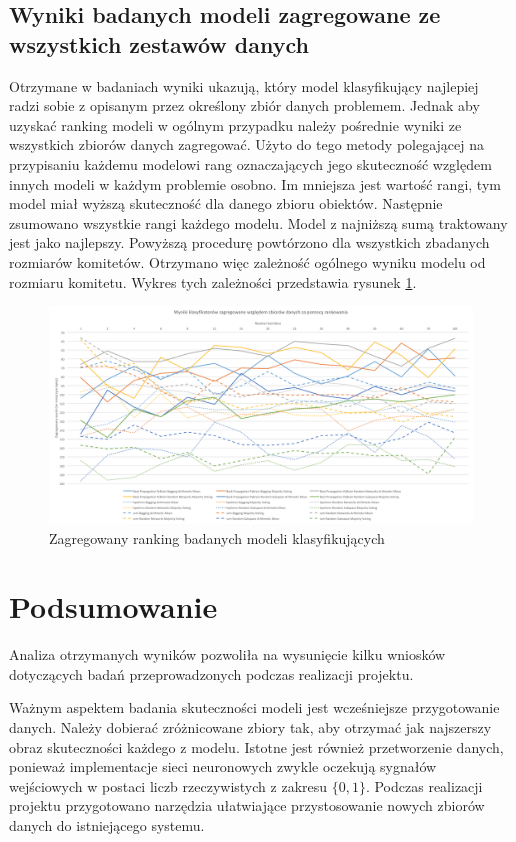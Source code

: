 \documentclass[11pt, a4paper, titlepage]{report}
\begin{document}
\section{Wyniki badanych modeli zagregowane ze wszystkich zestawów danych}
Otrzymane w badaniach wyniki ukazują, który model klasyfikujący najlepiej radzi sobie z opisanym przez określony zbiór danych problemem. Jednak aby uzyskać ranking modeli w ogólnym przypadku należy pośrednie wyniki ze wszystkich zbiorów danych zagregować. Użyto do tego metody polegającej na przypisaniu każdemu modelowi rang oznaczających jego skuteczność względem innych modeli w każdym problemie osobno. Im mniejsza jest wartość rangi, tym model miał wyższą skuteczność dla danego zbioru obiektów. Następnie zsumowano wszystkie rangi każdego modelu. Model z najniższą sumą traktowany jest jako najlepszy. Powyższą procedurę powtórzono dla wszystkich zbadanych rozmiarów komitetów. Otrzymano więc zależność ogólnego wyniku modelu od rozmiaru komitetu. Wykres tych zależności przedstawia rysunek \ref{fig:aggr_rank}.

\begin{figure}[H]
	\includegraphics[width=1.0\textwidth]{aggregated_rank}
    \centering
    \caption{Zagregowany ranking badanych modeli klasyfikujących}
    \label{fig:aggr_rank}
\end{figure}


\chapter{Podsumowanie}
Analiza otrzymanych wyników pozwoliła na wysunięcie kilku wniosków dotyczących badań przeprowadzonych podczas realizacji projektu.

Ważnym aspektem badania skuteczności modeli jest wcześniejsze przygotowanie danych. Należy dobierać zróżnicowane zbiory tak, aby otrzymać jak najszerszy obraz skuteczności każdego z modelu. Istotne jest również przetworzenie danych, ponieważ implementacje sieci neuronowych zwykle oczekują sygnałów wejściowych w postaci liczb rzeczywistych z zakresu $\{0, 1\}$. Podczas realizacji projektu przygotowano narzędzia ułatwiające przystosowanie nowych zbiorów danych do istniejącego systemu.
\end{document}
